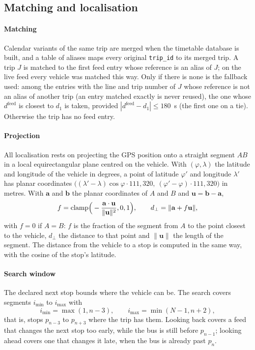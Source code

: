 \subsection{Matching and localisation}
\label{sec:localisation}

\paragraph{Matching} Calendar variants of the same trip are merged when the timetable database is built, and a table
of aliases maps every original \texttt{trip\_id} to its merged trip. A trip $J$ is matched to the first feed entry
whose reference is an alias of $J$; on the live feed every vehicle was matched this way. Only if there is none is the
fallback used: among the entries with the line and trip number of $J$ whose reference is not an alias of another trip
(an entry matched exactly is never reused), the one whose $d^{\mathrm{feed}}$ is closest to $d_1$ is taken, provided
$|d^{\mathrm{feed}}-d_1|\le180$~s (the first one on a tie). Otherwise the trip has no feed entry.

\paragraph{Projection} All localisation rests on projecting the GPS position onto a straight segment $AB$ in a local
equirectangular plane centred on the vehicle. With $(\varphi,\lambda)$ the latitude and longitude of the vehicle in
degrees, a point of latitude $\varphi'$ and longitude $\lambda'$ has planar coordinates
$\big((\lambda'-\lambda)\cos\varphi\cdot111{,}320,\ (\varphi'-\varphi)\cdot111{,}320\big)$ in metres. With $\mathbf a$
and $\mathbf b$ the planar coordinates of $A$ and $B$ and $\mathbf u=\mathbf b-\mathbf a$,
\begin{equation}
f=\operatorname{clamp}\!\Big(-\frac{\mathbf a\cdot\mathbf u}{\|\mathbf u\|^2},0,1\Big),\qquad d_\perp=\|\mathbf a+f\mathbf u\|,
\label{eq:projection}
\end{equation}
with $f=0$ if $A=B$: $f$ is the fraction of the segment from $A$ to the point closest to the vehicle, $d_\perp$ the
distance to that point and $\|\mathbf u\|$ the length of the segment. The distance from the vehicle to a stop is
computed in the same way, with the cosine of the stop's latitude.

\paragraph{Search window} The declared next stop bounds where the vehicle can be. The search covers segments $i_{\min}$
to $i_{\max}$ with
\begin{equation}
i_{\min}=\max(1,n-3),\qquad i_{\max}=\min(N-1,n+2),
\label{eq:window}
\end{equation}
that is, stops $p_{n-3}$ to $p_{n+3}$ where the trip has them. Looking back covers a feed that changes the next stop
too early, while the bus is still before $p_{n-1}$; looking ahead covers one that changes it late, when the bus is
already past $p_n$.

